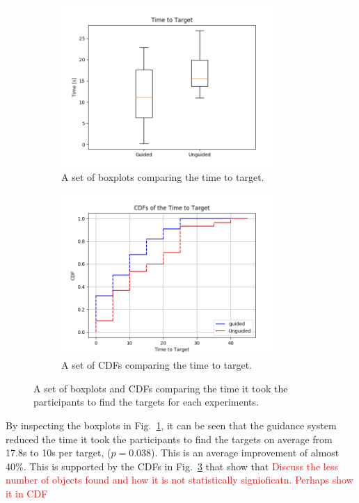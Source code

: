 \documentclass[runningheads]{llncs}
\newcommand\todo[1]{\textcolor{red}{#1}}
\begin{document}
\begin{figure}
  \begin{subfigure}{0.5\textwidth}
    \centering
    \includegraphics[width=0.9\textwidth]{figures/boxplot_time_to_target.png}
    \caption{A set of boxplots comparing the time to target. }\label{fig:boxplot-time}
  \end{subfigure}
  \begin{subfigure}{0.5\textwidth}
    \centering
    \includegraphics[width=0.9\textwidth]{figures/cumplot_time_to_target.png}
    \caption{A set of CDFs comparing the time to target. }\label{fig:cum-time}
  \end{subfigure}
  \caption{A set of boxplots and CDFs comparing the time it took the participants to find the targets for each experiments. }
\end{figure}

By inspecting the boxplots in Fig.~\ref{fig:boxplot-time}, it can be seen that the guidance system reduced the time it took the participants to find the targets on average from 17.8s to 10s per target, ($p = 0.038$).
This is an average improvement of almost 40\%.
This is supported by the CDFs in Fig.~\ref{fig:cum-time} that show that \todo{Discuss the less number of objects found and how it is not statistically signioficatn. Perhaps show it in CDF}
\end{document}

